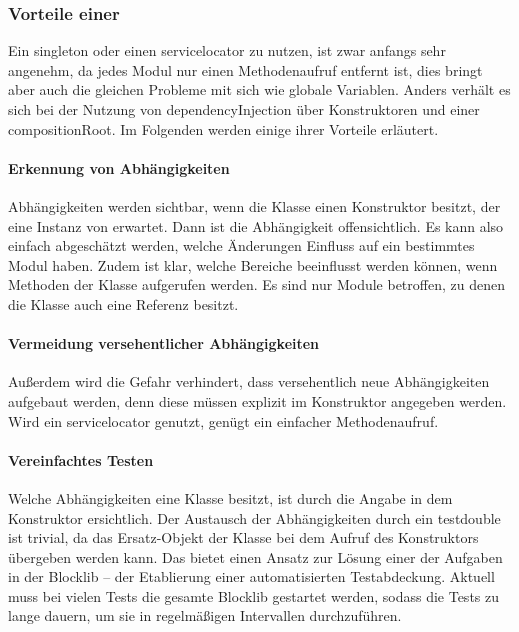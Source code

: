 \subsubsection{Vorteile einer }

Ein \gls{singleton} oder einen \gls{servicelocator} zu nutzen, ist zwar anfangs sehr angenehm, da jedes Modul nur einen Methodenaufruf entfernt ist, dies bringt aber auch die gleichen Probleme mit sich wie globale Variablen. Anders verhält es sich bei der Nutzung von \gls{dependencyInjection} über Konstruktoren und einer \gls{compositionRoot}. Im Folgenden werden einige ihrer Vorteile erläutert.

\paragraph{Erkennung von Abhängigkeiten}Abhängigkeiten werden sichtbar, wenn die Klasse einen Konstruktor besitzt, der eine Instanz von \classWorldInteraction{} erwartet. Dann ist die Abhängigkeit offensichtlich. Es kann also einfach abgeschätzt werden, welche Änderungen Einfluss auf ein bestimmtes Modul haben. Zudem ist klar, welche Bereiche beeinflusst werden können, wenn Methoden der Klasse aufgerufen werden. Es sind nur Module betroffen, zu denen die Klasse auch eine Referenz besitzt.

\paragraph{Vermeidung versehentlicher Abhängigkeiten} Außerdem wird die Gefahr verhindert, dass versehentlich neue Abhängigkeiten aufgebaut werden, denn diese müssen explizit im Konstruktor angegeben werden. Wird ein \gls{servicelocator} genutzt, genügt ein einfacher Methodenaufruf.

\paragraph{Vereinfachtes Testen} Welche Abhängigkeiten eine Klasse besitzt, ist durch die Angabe in dem Konstruktor ersichtlich. Der Austausch der Abhängigkeiten durch ein \gls{testdouble} ist trivial, da das Ersatz-Objekt der Klasse bei dem Aufruf des Konstruktors übergeben werden kann. Das bietet einen Ansatz zur Lösung einer der Aufgaben in der Blocklib -- der Etablierung einer automatisierten Testabdeckung. Aktuell muss bei vielen Tests die gesamte Blocklib gestartet werden, sodass die Tests zu lange dauern, um sie in regelmäßigen Intervallen durchzuführen.

